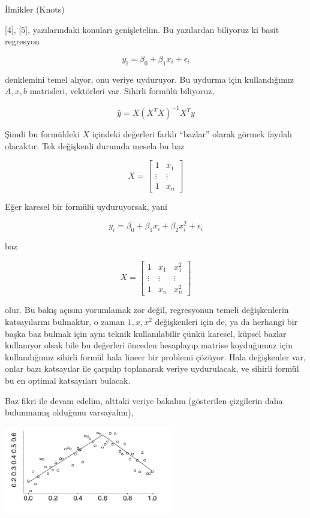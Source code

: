 \documentclass[12pt,fleqn]{article}\usepackage{../../common}
\begin{document}
İlmikler (Knots)

[4], [5], yazılarındaki konuları genişletelim. Bu yazılardan biliyoruz ki basit
regresyon

$$ y_i = \beta_0 + \beta_1 x_i + \epsilon_i$$

denklemini temel alıyor, onu veriye uyduruyor. Bu uydurma için
kullandığımız $A,x,b$ matrisleri, vektörleri var. Sihirli formülü
biliyoruz, 

$$ \hat{y} = X(X^TX)^{-1}X^Ty $$

Şimdi bu formüldeki $X$ içindeki değerleri farklı ``bazlar'' olarak görmek
faydalı olacaktır. Tek değişkenli durumda mesela bu baz

$$ X = 
\left[\begin{array}{cc}
1 & x_1 \\ \vdots & \vdots \\ 1 & x_n
\end{array}\right]
$$

Eğer karesel bir formülü uyduruyorsak, yani

$$ y_i = \beta_0 + \beta_1x_i + \beta_2x_i^2 + \epsilon_i $$

baz 

$$ X = 
\left[\begin{array}{ccc}
1 & x_1 & x_1^2\\ 
\vdots & \vdots & \vdots \\
1 & x_n & x_n^2
\end{array}\right]
$$

olur. Bu bakış açısını yorumlamak zor değil, regresyonun temeli
değişkenlerin katsayılarını bulmaktır, o zaman $1,x,x^2$ değişkenleri için
de, ya da herhangi bir başka baz bulmak için aynı teknik kullanılabilir
çünkü karesel, küpsel bazlar kullanıyor olsak bile bu değerleri önceden
hesaplayıp matrise koyduğumuz için kullandığımız sihirli formül hala lineer
bir problemi çözüyor. Hala değişkenler var, onlar bazı katsayılar ile
çarpılıp toplanarak veriye uydurulacak, ve sihirli formül bu en optimal
katsayıları bulacak.

Baz fikri ile devam edelim, alttaki veriye bakalım (gösterilen çizgilerin
daha bulunmamış olduğunu varsayalım),

\includegraphics[width=20em]{compscieng_app20_04.png}
\end{document}
